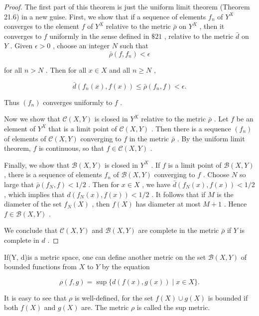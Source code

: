 \begin{proof}The first part of this theorem is just the uniform limit theorem (Theorem 21.6) in a new guise. First, we show that if a sequence of elements \({f}_{n}\) of \({Y}^{X}\) converges to the element \(f\) of \({Y}^{X}\) relative to the metric \(\bar{\rho }\) on \({Y}^{X}\) , then it converges to \(f\) uniformly in the sense defined in \(\$ {21}\) , relative to the metric \(\bar{d}\) on \(Y\) . Given \(\epsilon  > 0\) , choose an integer \(N\) such that
\[
\bar{\rho }\left( {f,{f}_{n}}\right)  < \epsilon
\]

for all \(n > N\) . Then for all \(x \in  X\) and all \(n \geq  N\) ,

\[
\bar{d}\left( {{f}_{n}\left( x\right) ,f\left( x\right) }\right)  \leq  \bar{\rho }\left( {{f}_{n},f}\right)  < \epsilon .
\]

Thus \(\left( {f}_{n}\right)\) converges uniformly to \(f\) .

Now we show that \(\mathcal{C}\left( {X,Y}\right)\) is closed in \({Y}^{X}\) relative to the metric \(\bar{\rho }\) . Let \(f\) be an element of \({Y}^{X}\) that is a limit point of \(\mathcal{C}\left( {X,Y}\right)\) . Then there is a sequence \(\left( {f}_{n}\right)\) of elements of \(\mathcal{C}\left( {X,Y}\right)\) converging to \(f\) in the metric \(\bar{\rho }\) . By the uniform limit theorem, \(f\) is continuous, so that \(f \in  \mathcal{C}\left( {X,Y}\right)\) .

Finally, we show that \(\mathcal{B}\left( {X,Y}\right)\) is closed in \({Y}^{X}\) . If \(f\) is a limit point of \(\mathcal{B}\left( {X,Y}\right)\) , there is a sequence of elements \({f}_{n}\) of \(\mathcal{B}\left( {X,Y}\right)\) converging to \(f\) . Choose \(N\) so large that \(\bar{\rho }\left( {{f}_{N},f}\right)  < 1/2\) . Then for \(x \in  X\) , we have \(\bar{d}\left( {{f}_{N}\left( x\right) ,f\left( x\right) }\right)  < 1/2\) , which implies that \(d\left( {{f}_{N}\left( x\right) ,f\left( x\right) }\right)  < 1/2\) . It follows that if \(M\) is the diameter of the set \({f}_{N}\left( X\right)\) , then \(f\left( X\right)\) has diameter at most \(M + 1\) . Hence \(f \in  \mathcal{B}\left( {X,Y}\right)\) .

We conclude that \(\mathcal{C}\left( {X,Y}\right)\) and \(\mathcal{B}\left( {X,Y}\right)\) are complete in the metric \(\bar{\rho }\) if \(Y\) is complete in \(d\) .
\end{proof}
\begin{definition} If(Y, d)is a metric space, one can define another metric on the set \(\mathcal{B}\left( {X,Y}\right)\) of bounded functions from \(X\) to \(Y\) by the equation

\[
\rho \left( {f,g}\right)  = \sup \{ d\left( {f\left( x\right) ,g\left( x\right) }\right)  \mid  x \in  X\} .
\]

It is easy to see that \(\rho\) is well-defined, for the set \(f\left( X\right)  \cup  g\left( X\right)\) is bounded if both \(f\left( X\right)\) and \(g\left( X\right)\) are. The metric \(\rho\) is called the sup metric.
\end{definition}

